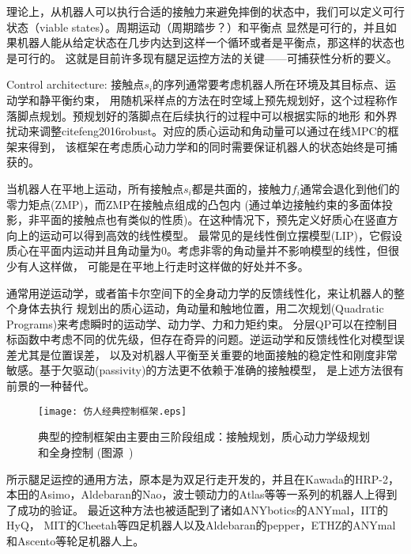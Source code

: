 理论上，从机器人可以执行合适的接触力来避免摔倒的状态中，我们可以定义可行状态（viable states）。周期运动（周期踏步？）和平衡点
显然是可行的，并且如果机器人能从给定状态在几步内达到这样一个循环或者是平衡点，那这样的状态也是可行的\cite{wieber2002stability}。
这就是目前许多现有腿足运控方法的关键\cite{wieber2016modeling}——可捕获性分析\cite{pratt2006velocity}的要义。

Control architecture: 接触点$s_i$的序列通常要考虑机器人所在环境及其目标点、运动学和静平衡约束\cite{escande2013planning}，
用随机采样点的方法在时空域上预先规划好，这个过程称作落脚点规划。预规划好的落脚点在后续执行的过程中可以根据实际的地形
和外界扰动来调整cite{feng2016robust}。对应的质心运动和角动量可以通过在线MPC的框架来得到\cite{wieber2006trajectory}，
该框架在考虑质心动力学和的同时需要保证机器人的状态始终是可捕获的\cite{wieber2016modeling}。

当机器人在平地上运动，所有接触点$s_i$都是共面的，接触力$f_i$通常会退化到他们的零力矩点(ZMP)，而ZMP在接触点组成的凸包内\cite{wieber2002stability}
(通过单边接触约束的多面体投影，非平面的接触点也有类似的性质\cite{caron2016zmp})。在这种情况下，预先定义好质心在竖直方向上的运动可以得到高效的线性模型。
最常见的是线性倒立摆模型(LIP)，它假设质心在平面内运动并且角动量为0\cite{kajita1991study}。考虑非零的角动量并不影响模型的线性，但很少有人这样做，
可能是在平地上行走时这样做的好处并不多\cite{koolen2012capturability}。

通常用逆运动学\cite{kajita2003resolved}，或者笛卡尔空间下的全身动力学的反馈线性化\cite{wieber2000constrained}，来让机器人的整个身体去执行
规划出的质心运动，角动量和触地位置，用二次规划(Quadratic Programs)来考虑瞬时的运动学、动力学、力和力矩约束\cite{wieber2000constrained, kuindersma2014efficiently}。
分层QP可以在控制目标函数中考虑不同的优先级\cite{escande2014hierarchical}，但存在奇异的问题\cite{wieber2017geometric}。逆运动学和反馈线性化对模型误差尤其是位置误差，
以及对机器人平衡至关重要的地面接触的稳定性和刚度非常敏感。基于欠驱动(passivity)的方法更不依赖于准确的接触模型\cite{henze2016passivity, kurtz2020approximate}，
是上述方法很有前景的一种替代。
\begin{figure}[htbp]
    \centering
    \texttt{[image: 仿人经典控制框架.eps]}
    \caption{\label{fig:typical_control}典型的控制框架由主要由三阶段组成：接触规划，质心动力学级规划和全身控制
                (图源~\cite{carpentier2016center})}
\end{figure}
所示腿足运控的通用方法，原本是为双足行走开发的，并且在Kawada的HRP-2\cite{takenaka2009real}，
本田的Asimo\cite{takenaka2009real}，Aldebaran的Nao\cite{gouaillier2010omni}，波士顿动力的Atlas\cite{Kuindersma2020Recent}等等一系列的机器人上得到了成功的验证。
最近这种方法也被适配到了诸如ANYbotics的ANYmal\cite{bellicoso2018dynamic}，IIT的HyQ\cite{mastalli2017trajectory}，
MIT的Cheetah\cite{di2018dynamic}等四足机器人以及Aldebaran的pepper\cite{lafaye2014linear}，ETHZ的ANYmal\cite{bjelonic2020rolling}
和Ascento\cite{klemm2020lqr}等轮足机器人上。

